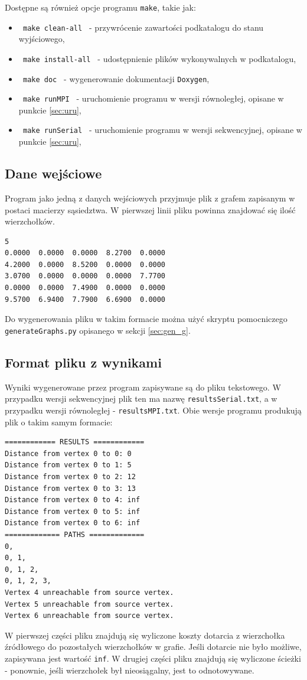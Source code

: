 \documentclass[12pt]{article}
\begin{document}
\noindent
Dostępne są również opcje programu \lstinline|make|, takie jak:
\begin{itemize}
\item \lstinline| make clean-all | - przywrócenie zawartości podkatalogu do stanu wyjściowego,
\item \lstinline| make install-all | - udostępnienie plików wykonywalnych w podkatalogu,
\item \lstinline| make doc |  - wygenerowanie dokumentacji \lstinline|Doxygen|,
\item \lstinline| make runMPI |  - uruchomienie programu w wersji równoległej, opisane w punkcie \ref{sec:uru},
\item \lstinline| make runSerial |  - uruchomienie programu w wersji sekwencyjnej, opisane w punkcie  \ref{sec:uru},
\end{itemize}

\subsection{Dane wejściowe}
Program jako jedną z danych wejściowych przyjmuje plik z grafem zapisanym w postaci macierzy sąsiedztwa.
W pierwszej linii pliku powinna znajdować się ilość wierzchołków.

\begin{lstlisting}[caption={Przykładowy graf zapisany w odpowiednim formacie.}, captionpos=b ]
5
0.0000  0.0000  0.0000  8.2700  0.0000
4.2000  0.0000  8.5200  0.0000  0.0000
3.0700  0.0000  0.0000  0.0000  7.7700
0.0000  0.0000  7.4900  0.0000  0.0000
9.5700  6.9400  7.7900  6.6900  0.0000
\end{lstlisting}

Do wygenerowania pliku w takim formacie można użyć skryptu pomocniczego \lstinline|generateGraphs.py| opisanego w sekcji \ref{sec:gen_g}.

\newpage
\subsection{Format pliku z wynikami}
Wyniki wygenerowane przez program zapisywane są do pliku tekstowego. W przypadku wersji sekwencyjnej plik ten ma nazwę \lstinline{resultsSerial.txt}, a w przypadku wersji równoległej - \lstinline{resultsMPI.txt}. Obie wersje programu produkują plik o takim samym formacie:
\begin{lstlisting}[caption={Przykład pliku z wynikami}, captionpos=b ]
============ RESULTS ============
Distance from vertex 0 to 0: 0
Distance from vertex 0 to 1: 5
Distance from vertex 0 to 2: 12
Distance from vertex 0 to 3: 13
Distance from vertex 0 to 4: inf
Distance from vertex 0 to 5: inf
Distance from vertex 0 to 6: inf
============= PATHS =============
0,
0, 1,
0, 1, 2,
0, 1, 2, 3,
Vertex 4 unreachable from source vertex.
Vertex 5 unreachable from source vertex.
Vertex 6 unreachable from source vertex.
\end{lstlisting}
W pierwszej części pliku znajdują się wyliczone koszty dotarcia z wierzchołka źródłowego do pozostałych wierzchołków w grafie. Jeśli dotarcie nie było możliwe, zapisywana jest wartość \lstinline{inf}. W drugiej części pliku znajdują się wyliczone ścieżki - ponownie, jeśli wierzchołek był nieosiągalny, jest to odnotowywane.
\end{document}
